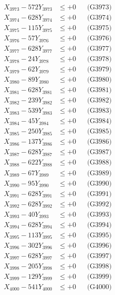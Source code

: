 \documentclass[a4paper,10pt]{article}
\begin{document}
{\begin{align}
X_{3973} - 572Y_{3973} &\leq +0 && \text{(G3973)} \\
X_{3974} - 628Y_{3974} &\leq +0 && \text{(G3974)} \\
X_{3975} - 115Y_{3975} &\leq +0 && \text{(G3975)} \\
X_{3976} - 57Y_{3976} &\leq +0 && \text{(G3976)} \\
X_{3977} - 628Y_{3977} &\leq +0 && \text{(G3977)} \\
X_{3978} - 24Y_{3978} &\leq +0 && \text{(G3978)} \\
X_{3979} - 62Y_{3979} &\leq +0 && \text{(G3979)} \\
X_{3980} - 89Y_{3980} &\leq +0 && \text{(G3980)} \\
\allowbreak
X_{3981} - 628Y_{3981} &\leq +0 && \text{(G3981)} \\
X_{3982} - 239Y_{3982} &\leq +0 && \text{(G3982)} \\
X_{3983} - 539Y_{3983} &\leq +0 && \text{(G3983)} \\
X_{3984} - 45Y_{3984} &\leq +0 && \text{(G3984)} \\
X_{3985} - 250Y_{3985} &\leq +0 && \text{(G3985)} \\
X_{3986} - 137Y_{3986} &\leq +0 && \text{(G3986)} \\
X_{3987} - 628Y_{3987} &\leq +0 && \text{(G3987)} \\
X_{3988} - 622Y_{3988} &\leq +0 && \text{(G3988)} \\
X_{3989} - 67Y_{3989} &\leq +0 && \text{(G3989)} \\
X_{3990} - 95Y_{3990} &\leq +0 && \text{(G3990)} \\
\allowbreak
X_{3991} - 628Y_{3991} &\leq +0 && \text{(G3991)} \\
X_{3992} - 628Y_{3992} &\leq +0 && \text{(G3992)} \\
X_{3993} - 40Y_{3993} &\leq +0 && \text{(G3993)} \\
X_{3994} - 628Y_{3994} &\leq +0 && \text{(G3994)} \\
X_{3995} - 113Y_{3995} &\leq +0 && \text{(G3995)} \\
X_{3996} - 302Y_{3996} &\leq +0 && \text{(G3996)} \\
X_{3997} - 628Y_{3997} &\leq +0 && \text{(G3997)} \\
X_{3998} - 205Y_{3998} &\leq +0 && \text{(G3998)} \\
X_{3999} - 129Y_{3999} &\leq +0 && \text{(G3999)} \\
X_{4000} - 541Y_{4000} &\leq +0 && \text{(G4000)} \\

\end{align}}
\end{document}
